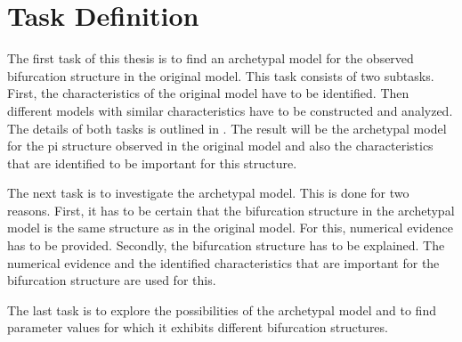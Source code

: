 \chapter{Task Definition}
\label{chap:task}

The first task of this thesis is to find an archetypal model for the observed bifurcation structure in the original model.
This task consists of two subtasks.
First, the characteristics of the original model have to be identified.
Then different models with similar characteristics have to be constructed and analyzed.
The details of both tasks is outlined in .
The result will be the archetypal model for the \gls{pi} structure observed in the original model and also the characteristics that are identified to be important for this structure.

The next task is to investigate the archetypal model.
This is done for two reasons.
First, it has to be certain that the bifurcation structure in the archetypal model is the same structure as in the original model.
For this, numerical evidence has to be provided.
Secondly, the bifurcation structure has to be explained.
The numerical evidence and the identified characteristics that are important for the bifurcation structure are used for this.

The last task is to explore the possibilities of the archetypal model and to find parameter values for which it exhibits different bifurcation structures.
